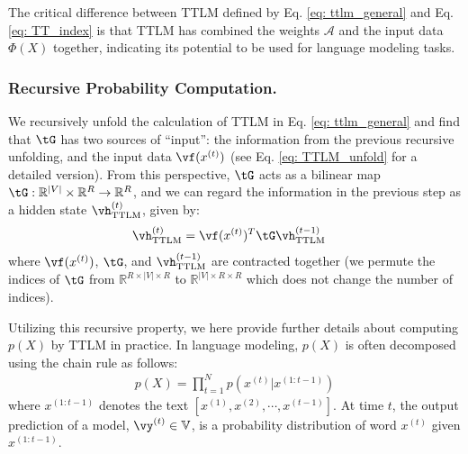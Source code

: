 \documentclass{article}
\theoremstyle{plain}
\theoremstyle{definition}
\theoremstyle{remark}
\begin{document}
The critical difference between TTLM defined by Eq. \ref{eq: ttlm_general} and  Eq. \ref{eq: TT_index}  is that TTLM has combined the weights $\mathcal{A}$ and the input data $\Phi(X)$  together, indicating its potential to be used for language modeling tasks.

\subsubsection{Recursive Probability Computation.}
\label{sec:recursive probability}
We recursively unfold the calculation of TTLM in Eq. \ref{eq: ttlm_general} and find that $\tG$ has two sources of ``input'': the information from the previous recursive unfolding, and the input data $\vf(x^{(t)})$ (see Eq. \ref{eq: TTLM_unfold} for a detailed version). 
From this perspective, $\tG$ acts as a bilinear map $\tG: \mathbb{R}^{|V|} \times \mathbb{R}^R \rightarrow \mathbb{R}^R $, and we can regard the information in the previous step as a hidden state $\vh^{(t)}_\text{TTLM}$, given by:
%
\begin{align}
    \label{eq: ttlm cell full}
    \vh^{(t)}_{\textrm{TTLM}}
    & = \vf(x^{(t)})^T\tG  \vh^{(t-1)}_{\textrm{TTLM}} 
\end{align}
%
where $\vf(x^{(t)})$, $\tG$, and  $\vh^{(t-1)}_{\textrm{TTLM}}$ are contracted together (we permute the indices of $\tG$ from $\mathbb{R}^{R \times |V| \times R}$ to $\mathbb{R}^{|V| \times R \times R}$ which does not change the number of indices). 

Utilizing this recursive property, we here provide further details about computing $p(X)$ by TTLM in practice. In language modeling, $p(X)$ is often decomposed using the chain rule \citep{bahl1983maximum} as follows:
%
\begin{align}
    p(X) = \prod_{t=1}^N p(x^{(t)}|x^{(1:t-1)}) \nonumber
\end{align}
%
where $x^{(1:t-1)}$ denotes the text $[x^{(1)}, x^{(2)}, \cdots ,x^{(t-1)}]$.  At time $t$, the output prediction of a model, $\vy^{(t)}\in \mathbb{V}$, is a probability distribution of word $x^{(t)}$ given $x^{(1:t-1)}$. 
\end{document}

